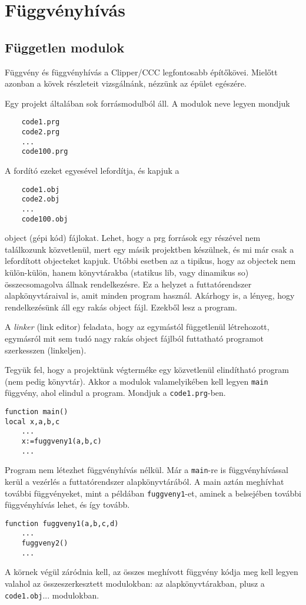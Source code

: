 

\section{Függvényhívás}


\subsection{Független modulok}

Függvény és függvényhívás a Clipper/CCC legfontosabb építőkövei. 
Mielőtt azonban a kövek részleteit vizsgálnánk, nézzünk az épület egészére.

Egy projekt általában sok forrásmodulból áll. A modulok neve legyen mondjuk
\begin{verbatim} 
    code1.prg
    code2.prg
    ...
    code100.prg
\end{verbatim}
A fordító ezeket egyesével lefordítja, és kapjuk a
\begin{verbatim} 
    code1.obj
    code2.obj
    ...
    code100.obj
\end{verbatim}
object (gépi kód) fájlokat. Lehet, hogy a prg források egy részével nem találkozunk 
közvetlenül, mert egy másik projektben készülnek, és mi már csak a lefordított 
objecteket kapjuk. Utóbbi  esetben az a tipikus, hogy az objectek nem külön-külön, 
hanem könyvtárakba (statikus lib, vagy dinamikus so) összecsomagolva állnak 
rendelkezésre. Ez a helyzet a futtatórendszer alapkönyvtáraival is,
amit minden program használ. Akárhogy is, a lényeg, hogy rendelkezésünk áll 
egy rakás object fájl. Ezekből lesz a program.

A {\em linker\/} (link editor) feladata, hogy az egymástól függetlenül 
létrehozott, egymásról mit sem tudó nagy rakás object fájlból futtatható 
programot szerkesszen (linkeljen).

Tegyük fel, hogy a projektünk végterméke egy közvetlenül elindítható program
(nem pedig könyvtár). Akkor a modulok valamelyikében kell legyen \verb!main!
függvény, ahol elindul a program. Mondjuk a \verb!code1.prg!-ben.
\begin{verbatim} 
function main()
local x,a,b,c
    ...
    x:=fuggveny1(a,b,c)
    ...
\end{verbatim}
Program nem létezhet függvényhívás nélkül.
Már a \verb!main!-re is függvényhívással kerül a vezérlés 
a futtatórendszer alapkönyvtárából. A main aztán meghívhat további
függvényeket, mint a példában \verb!fuggveny1!-et, aminek a belsejében 
további függvényhívás lehet, és így tovább. 
\begin{verbatim} 
function fuggveny1(a,b,c,d)
    ...
    fuggveny2()
    ...
\end{verbatim}
A körnek végül záródnia kell, az összes meghívott függvény
kódja meg kell legyen valahol az összeszerkesztett modulokban: 
az alapkönyvtárakban, plusz a \verb!code1.obj!... modulokban.

